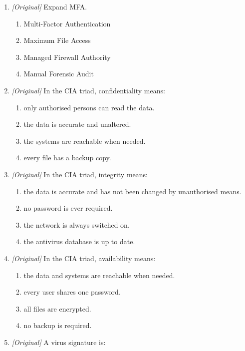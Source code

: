\begin{enumerate}[label=\textbf{Q\arabic*.}, leftmargin=*]
\end{enumerate}
\begin{enumerate}[label=\textbf{Q\arabic*.}, leftmargin=*]
\item \textit{[Original]} Expand MFA.
  \begin{enumerate}[label=\Alph*.]
    \item Multi-Factor Authentication
    \item Maximum File Access
    \item Managed Firewall Authority
    \item Manual Forensic Audit
  \end{enumerate}
\item \textit{[Original]} In the CIA triad, confidentiality means:
  \begin{enumerate}[label=\Alph*.]
    \item only authorised persons can read the data.
    \item the data is accurate and unaltered.
    \item the systems are reachable when needed.
    \item every file has a backup copy.
  \end{enumerate}
\item \textit{[Original]} In the CIA triad, integrity means:
  \begin{enumerate}[label=\Alph*.]
    \item the data is accurate and has not been changed by unauthorised means.
    \item no password is ever required.
    \item the network is always switched on.
    \item the antivirus database is up to date.
  \end{enumerate}
\item \textit{[Original]} In the CIA triad, availability means:
  \begin{enumerate}[label=\Alph*.]
    \item the data and systems are reachable when needed.
    \item every user shares one password.
    \item all files are encrypted.
    \item no backup is required.
  \end{enumerate}
\item \textit{[Original]} A virus signature is:
  \begin{enumerate}[label=\Alph*.]

\end{enumerate}
\end{enumerate}
